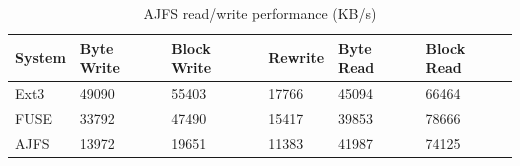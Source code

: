 \begin{table}[Ht]
\caption{AJFS read/write performance (KB/s)}
\centering
\begin{tabular}{|p{0.9cm}|p{0.9cm}|p{0.9cm}|p{0.9cm}|p{0.9cm}|p{0.9cm}|}
\hline\hline
System & Byte Write & Block Write & Rewrite & Byte Read & Block Read \\
\hline
Ext3	& 49090	& 55403	& 17766	& 45094	& 66464	\\
\hline
FUSE	& 33792	& 47490	& 15417	& 39853	& 78666	\\
\hline
AJFS	& 13972	& 19651	& 11383	& 41987	& 74125	\\
\hline
\end{tabular}
\label{table:performance}
\end{table}
